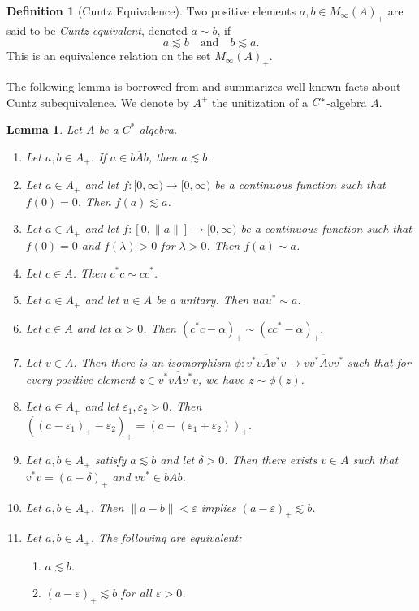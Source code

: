 \documentclass[12pt]{amsart}
\theoremstyle{plain}
\newtheorem{lem}[thm]{Lemma}
\theoremstyle{definition}
\newtheorem{defn}[thm]{Definition}
\numberwithin{equation}{section}
\begin{document}
\begin{defn}[Cuntz Equivalence]
Two positive elements $a, b \in M_{\infty}(A)_+$ are said to be \textit{Cuntz equivalent}, denoted $a \sim b$, if 
\[ a \lesssim b \quad \text{and} \quad b \lesssim a. \]
This is an equivalence relation on the set $M_{\infty}(A)_+$. 
\end{defn}
The following lemma is borrowed from \cite[Lemma 1.4]{P} and summarizes well-known facts about Cuntz subequivalence. We denote by $A^{+} $ the unitization of a $C\sp*$-algebra $A$. 
\begin{lem} \label{lem:cuntz_properties}
Let $A$ be a $C^*$-algebra.
\begin{enumerate}
    \item Let $a, b \in A_+$. If $a \in \overline{bAb}$, then $a \lesssim b$.
    \item Let $a \in A_+$ and let $f: [0, \infty) \to [0, \infty)$ be a continuous function such that $f(0) = 0$. Then $f(a) \lesssim a$.
    \item Let $a \in A_+$ and let $f: [0, \|a\|] \to [0, \infty)$ be a continuous function such that $f(0) = 0$ and $f(\lambda) > 0$ for $\lambda > 0$. Then $f(a) \sim  a$.
    \item Let $c \in A$. Then $c^*c \sim cc^*$.
    \item Let $a \in A_+$ and let $u \in A$ be a unitary. Then $uau^* \sim  a$.
    \item Let $c \in A$ and let $\alpha > 0$. Then $(c^*c - \alpha)_+ \sim  (cc^* - \alpha)_+$.
    \item Let $v \in A$. Then there is an isomorphism $\phi: \overline{v^*vAv^*v} \to \overline{vv^*Avv^*}$ such that for every positive element $z \in \overline{v^*vAv^*v}$, we have $z \sim  \phi(z)$.
    \item Let $a \in A_+$ and let $\varepsilon_1, \varepsilon_2 > 0$. Then $((a - \varepsilon_1)_+ - \varepsilon_2)_+ = (a - (\varepsilon_1 + \varepsilon_2))_+$.
    \item Let $a, b \in A_+$ satisfy $a \lesssim b$ and let $\delta > 0$. Then there exists $v \in A$ such that $v^*v = (a - \delta)_+$ and $vv^* \in \overline{bAb}$.
    \item Let $a, b \in A_+$. Then $\|a - b\| < \varepsilon$ implies $(a - \varepsilon)_{+} \lesssim  b$.
    \item Let $a, b \in A_+$. The following are equivalent:
    \begin{enumerate}
        \item $a \lesssim b$.
        \item $(a - \varepsilon)_{+} \lesssim b$ for all $\varepsilon > 0$.

\end{enumerate}
\end{enumerate}
\end{lem}
\end{document}
